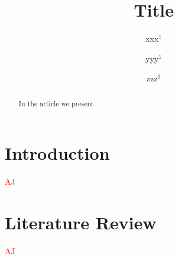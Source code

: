 \documentclass{llncs}
\begin{document}
\title{Title}
\author{xxx$^{1}$
\and yyy$^1$
\and zzz$^{1}$
}


\maketitle

\pagestyle{empty}  %

\begin{abstract}
In the article we present
\end{abstract}



\section{Introduction}
  \label{sec:Introduction}

\textcolor{red} {AJ}






\section{Literature Review}
  \label{sec:Literature Review}
\textcolor{red} {AJ}
\end{document}
